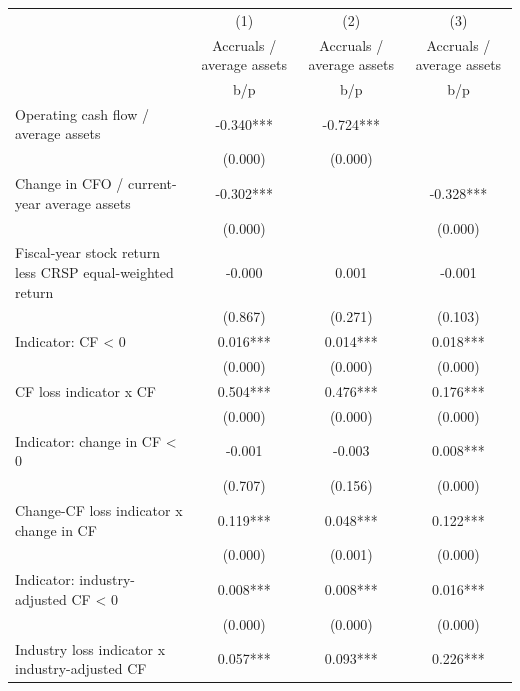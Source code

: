 {
\def\sym#1{\ifmmode^{#1}\else\(^{#1}\)\fi}
\begin{tabular}{l*{3}{c}}
\hline\hline
                    &\multicolumn{1}{c}{(1)}&\multicolumn{1}{c}{(2)}&\multicolumn{1}{c}{(3)}\\
                    &\multicolumn{1}{c}{Accruals / average assets}&\multicolumn{1}{c}{Accruals / average assets}&\multicolumn{1}{c}{Accruals / average assets}\\
                    &         b/p   &         b/p   &         b/p   \\
\hline
Operating cash flow / average assets&      -0.340***&      -0.724***&               \\
                    &     (0.000)   &     (0.000)   &               \\
Change in CFO / current-year average assets&      -0.302***&               &      -0.328***\\
                    &     (0.000)   &               &     (0.000)   \\
Fiscal-year stock return less CRSP equal-weighted return&      -0.000   &       0.001   &      -0.001   \\
                    &     (0.867)   &     (0.271)   &     (0.103)   \\
Indicator: CF < 0   &       0.016***&       0.014***&       0.018***\\
                    &     (0.000)   &     (0.000)   &     (0.000)   \\
CF loss indicator x CF&       0.504***&       0.476***&       0.176***\\
                    &     (0.000)   &     (0.000)   &     (0.000)   \\
Indicator: change in CF < 0&      -0.001   &      -0.003   &       0.008***\\
                    &     (0.707)   &     (0.156)   &     (0.000)   \\
Change-CF loss indicator x change in CF&       0.119***&       0.048***&       0.122***\\
                    &     (0.000)   &     (0.001)   &     (0.000)   \\
Indicator: industry-adjusted CF < 0&       0.008***&       0.008***&       0.016***\\
                    &     (0.000)   &     (0.000)   &     (0.000)   \\
Industry loss indicator x industry-adjusted CF&       0.057***&       0.093***&       0.226***\\

\end{tabular}}
